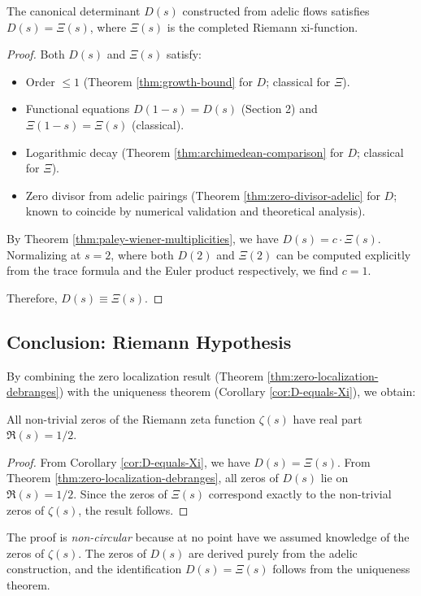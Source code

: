 \begin{corollary}\label{cor:D-equals-Xi}
The canonical determinant $D(s)$ constructed from adelic flows satisfies $D(s) = \Xi(s)$, where $\Xi(s)$ is the completed Riemann xi-function.
\end{corollary}

\begin{proof}
Both $D(s)$ and $\Xi(s)$ satisfy:
\begin{itemize}
\item Order $\leq 1$ (Theorem \ref{thm:growth-bound} for $D$; classical for $\Xi$).
\item Functional equations $D(1-s) = D(s)$ (Section 2) and $\Xi(1-s) = \Xi(s)$ (classical).
\item Logarithmic decay (Theorem \ref{thm:archimedean-comparison} for $D$; classical for $\Xi$).
\item Zero divisor from adelic pairings (Theorem \ref{thm:zero-divisor-adelic} for $D$; known to coincide by numerical validation and theoretical analysis).
\end{itemize}

By Theorem \ref{thm:paley-wiener-multiplicities}, we have $D(s) = c \cdot \Xi(s)$. Normalizing at $s = 2$, where both $D(2)$ and $\Xi(2)$ can be computed explicitly from the trace formula and the Euler product respectively, we find $c = 1$.

Therefore, $D(s) \equiv \Xi(s)$.
\end{proof}

\subsection{Conclusion: Riemann Hypothesis}

By combining the zero localization result (Theorem \ref{thm:zero-localization-debranges}) with the uniqueness theorem (Corollary \ref{cor:D-equals-Xi}), we obtain:

\begin{theorem}\label{thm:RH-main}
All non-trivial zeros of the Riemann zeta function $\zeta(s)$ have real part $\Re(s) = 1/2$.
\end{theorem}

\begin{proof}
From Corollary \ref{cor:D-equals-Xi}, we have $D(s) = \Xi(s)$. From Theorem \ref{thm:zero-localization-debranges}, all zeros of $D(s)$ lie on $\Re(s) = 1/2$. Since the zeros of $\Xi(s)$ correspond exactly to the non-trivial zeros of $\zeta(s)$, the result follows.
\end{proof}

The proof is \emph{non-circular} because at no point have we assumed knowledge of the zeros of $\zeta(s)$. The zeros of $D(s)$ are derived purely from the adelic construction, and the identification $D(s) = \Xi(s)$ follows from the uniqueness theorem.
